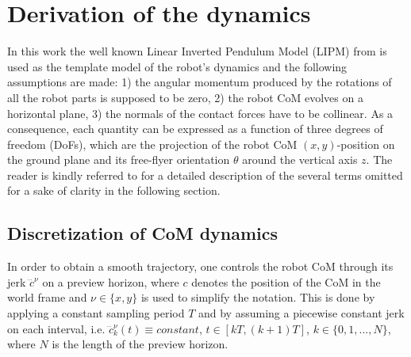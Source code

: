 
\section{Derivation of the dynamics}
\label{Sec:dynamic}

In this work the well known Linear Inverted Pendulum Model (LIPM) from \cite{Kajita:icra:2003} is used as the template model of the robot's dynamics 
and the following assumptions are made:
1) the angular momentum produced by the rotations of all the robot parts is supposed to be zero,
2) the robot CoM evolves on a horizontal plane,
3) the normals of the contact forces have to be collinear.
As a consequence, each quantity can be expressed as a function of three degrees of freedom (DoFs), which are the projection of the robot CoM $(x,y)$-position on the ground plane and its free-flyer orientation $\theta$ around the vertical axis $z$.
The reader is kindly referred to \cite{herdt:iros:2010} for a detailed description of the several terms omitted for a sake of clarity in the following section.

\subsection{Discretization of CoM dynamics}
\label{SubSec:comDiscr}

In order to obtain a smooth trajectory, one controls the robot CoM through its jerk $\dddot{c}^{\nu}$ on a preview horizon, where $c$ denotes the position of the CoM in the world frame and $\nu \in \{ x, y \}$
is used to simplify the notation.
This is done by applying a constant sampling period $T$ and by assuming a piecewise constant jerk on each interval, i.e. $\dddot{c}_{k}^{\nu}(t) \equiv constant$, $t \in \left[k T, (k+1) T \right]$, $k\in\{0, 1, ..., N\}$, where $N$ is the length of the preview horizon.

